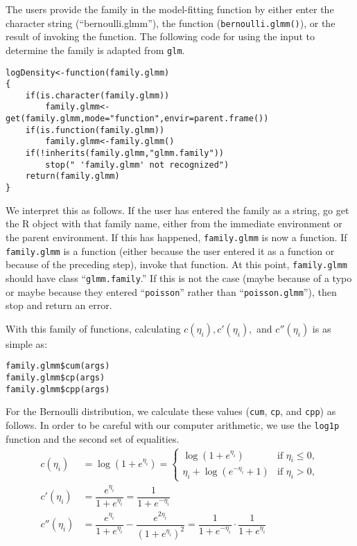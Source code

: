 \documentclass{article}
\begin{document}
The users provide the family in the model-fitting function by either enter the character string (``bernoulli.glmm''), the function (\texttt{bernoulli.glmm()}), or the result of invoking the function.  The following code for using the input to determine the family is adapted from \texttt{glm}.

\begin{verbatim}
logDensity<-function(family.glmm)
{
	if(is.character(family.glmm))
		family.glmm<-get(family.glmm,mode="function",envir=parent.frame())
	if(is.function(family.glmm))
		family.glmm<-family.glmm()
	if(!inherits(family.glmm,"glmm.family")) 
		stop(" 'family.glmm' not recognized") 
	return(family.glmm)
}
\end{verbatim}
We interpret this as follows.  If the user has entered the family as a string, go get the R object with that family name, either from the immediate environment or the parent environment.  If this has happened, \texttt{family.glmm} is now a function.  If \texttt{family.glmm} is a function (either because the user entered it as a function or because of the preceding step), invoke that function.  At this point, \texttt{family.glmm} should have  class ``\texttt{glmm.family}.'' If this is not the case (maybe because of a typo or maybe because they entered ``\texttt{poisson}'' rather than ``\texttt{poisson.glmm}''), then stop and return an error.

With this family of functions, calculating $c(\eta_i), c'(\eta_i),$ and  $c''(\eta_i)$ is as simple as: 
\begin{verbatim}
family.glmm$cum(args)
family.glmm$cp(args)
family.glmm$cpp(args)
\end{verbatim}

For the Bernoulli distribution, we calculate these values (\texttt{cum}, \texttt{cp}, and \texttt{cpp}) as follows. In order to be careful with our computer arithmetic, we use the \texttt{log1p} function and the second set of equalities.  
\begin{align}
c(\eta_i) &= \log(1+e^{\eta_i}) =
  \begin{cases}
    \log(1+e^{\eta_i}) & \text{if } \eta_i\leq 0,\\
    \eta_i+\log(e^{-\eta_i}+1) & \text{if } \eta_i >0,
  \end{cases}\\
c'(\eta_i)&=\dfrac{ e^{{\eta_{i}}}}{ 1+e^{{\eta_{i}}}} = \dfrac{1}{1+e^{-\eta_i}}\\
c''(\eta_i)&=   \dfrac{e^{{\eta_{i}}}}{  1+ e^{{\eta_{i}}} }  - \dfrac{e^{2{\eta_{i}}}}{    (  1+ e^{{\eta_{i}}})^2}  = \dfrac{1}{1+e^{-\eta_i}}\cdot \dfrac{1}{1+e^{\eta_i}}
\end{align}
\end{document}
